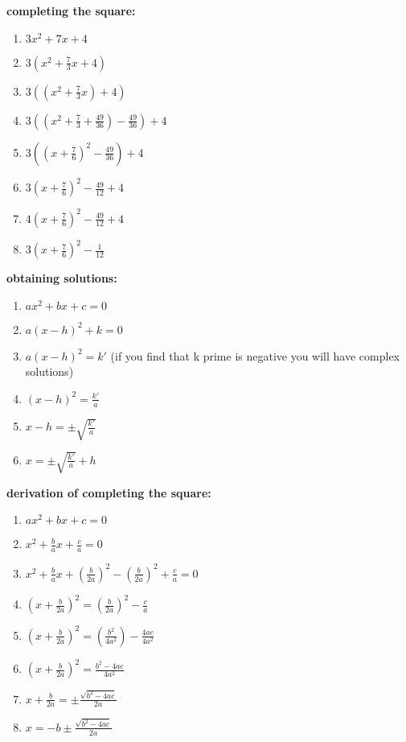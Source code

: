 \documentclass{article}
\begin{document}
\textbf{completing the square:}
	\begin{enumerate}
		\item $3x^2 + 7x + 4$
		\item $3(x^2 + \frac{7}{3}x + 4)$
		\item $3((x^2 + \frac{7}{3}x) + 4)$
		\item $3((x^2 + \frac{7}{3} + \frac{49}{36}) - \frac{49}{36}) + 4$
		\item $3((x + \frac{7}{6})^2 - \frac{49}{36}) + 4$
		\item $3(x + \frac{7}{6})^2 - \frac{49}{12} + 4$
		\item $4(x + \frac{7}{6})^2 - \frac{49}{12} + 4$
		\item $3(x + \frac{7}{6})^2 - \frac{1}{12}$
	\end{enumerate}

\textbf{obtaining solutions:}
	\begin{enumerate}
		\item $ax^2 + bx + c = 0$
		\item $a(x - h)^2 + k = 0$
		\item $a(x - h)^2 = k'$ (if you find that k prime is negative you will have complex solutions) 
		\item $(x - h)^2 = \frac{k'}{a}$ 
		\item $x - h = \pm \sqrt{\frac{k'}{a}}$
		\item $x = \pm \sqrt{\frac{k'}{a}} + h$
	\end{enumerate}

\textbf{derivation of completing the square:}
	\begin{enumerate}
		\item $ax^2 + bx + c = 0$
		\item $x^2 + \frac{b}{a}x + \frac{c}{a} = 0$
		\item $x^2 + \frac{b}{a}x + (\frac{b}{2a})^2 - (\frac{b}{2a})^2 + \frac{c}{a} = 0$
		\item $(x + \frac{b}{2a})^2 = (\frac{b}{2a})^2 - \frac{c}{a}$
	
		\item $(x + \frac{b}{2a})^2 = (\frac{b^2}{4a^2}) - \frac{4ac}{4a^2}$
		\item $(x + \frac{b}{2a})^2 = \frac{b^2 - 4ac}{4a^2}$
		\item $x + \frac{b}{2a} = \pm \frac{\sqrt{b^2 - 4ac}}{2a}$
		\item $x = -b \pm \frac{\sqrt{b^2 - 4ac}}{2a}$
	\end{enumerate}
\end{document}
